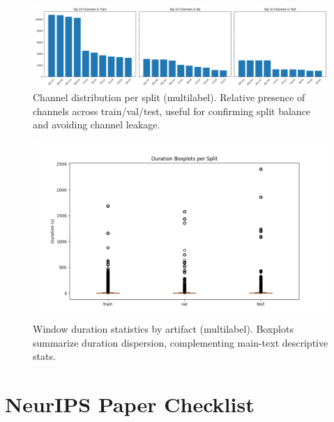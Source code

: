 \documentclass{article}
\begin{document}
\begin{figure}[t]
  \centering
  \includegraphics[width=0.95\linewidth]{figs/channel_dist_per_split_multilabel.png}
  \caption{Channel distribution per split (multilabel). Relative presence of channels across train/val/test, useful for confirming split balance and avoiding channel leakage.}
  \label{fig:app-channel-dist}
\end{figure}

\begin{figure}[t]
  \centering
  \includegraphics[width=0.95\linewidth]{figs/duration_boxplot_multilabel.png}
  \caption{Window duration statistics by artifact (multilabel). Boxplots summarize duration dispersion, complementing main-text descriptive stats.}
  \label{fig:app-duration-box}
\end{figure}

\newpage


\clearpage
\section*{NeurIPS Paper Checklist}
\end{document}
